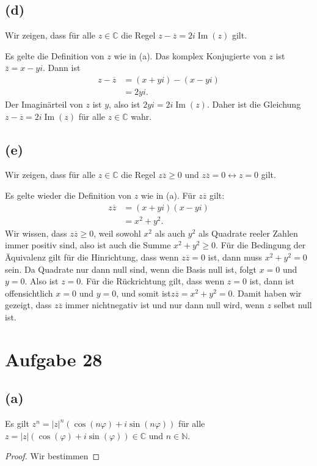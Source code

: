 \documentclass{article}
\theoremstyle{definition}
\theoremstyle{remark}
\begin{document}
\subsection*{(d)}
Wir zeigen, dass für alle \( z \in \mathbb{C} \) die Regel \( z - \overline{z} = 2i \operatorname{Im}(z) \) gilt.

\proof Es gelte die Definition von \( z \) wie in (a).
Das komplex Konjugierte von \( z \) ist \( \overline{z} = x - yi \). Dann ist
\begin{align*}
	z - \overline{z} & = (x + yi) - (x - yi) \\
	                 & = 2yi.
\end{align*}
Der Imaginärteil von \( z \) ist \( y \), also ist \( 2yi = 2i \operatorname{Im}(z) \). Daher ist die Gleichung \( z - \overline{z} = 2i \operatorname{Im}(z) \) für alle \( z \in \mathbb{C} \) wahr.
\endproof

\subsection*{(e)}
Wir zeigen, dass für alle \( z \in \mathbb{C} \) die Regel \( z \overline{z} \ge 0 \) und \( z \overline{z} = 0 \leftrightarrow z = 0\) gilt.

\proof Es gelte wieder die Definition von \( z \) wie in (a).
Für \( z \overline{z} \) gilt:
\begin{align*}
	z \overline{z} & = (x + yi)(x - yi) \\
	               & = x^2 + y^2.
\end{align*}
Wir wissen, dass \( z \overline{z} \ge 0\), weil sowohl \( x^2 \) als auch \( y^2 \) als Quadrate reeler Zahlen immer positiv sind, also ist auch die Summe \( x^2 + y^2 \ge 0 \).
Für die Bedingung der Äquivalenz gilt für die Hinrichtung, dass wenn \( z \overline{z} = 0 \) ist, dann muss \( x^2 + y^2 = 0\) sein. Da Quadrate nur dann null sind, wenn die Basis null ist, folgt \( x = 0 \) und \( y = 0 \). Also ist \( z = 0 \).
Für die Rückrichtung gilt, dass wenn \( z = 0 \) ist, dann ist offensichtlich \( x = 0 \) und \( y = 0 \), und somit ist\( z \overline{z} = x^2 + y^2 = 0 \).
Damit haben wir gezeigt, dass \( z \overline{z} \) immer nichtnegativ ist und nur dann null wird, wenn \( z \) selbst null ist.
\endproof

\section*{Aufgabe 28}

\subsection*{(a)}

\begin{theorem*}
	Es gilt \( z^n = |z|^n(\cos(n \varphi) + i \sin(n \varphi))\) für alle \( z = |z|(\cos(\varphi) + i \sin(\varphi)) \in \mathbb{C} \) und \( n \in \mathbb{N} \).
\end{theorem*}

\begin{proof} Wir bestimmen
	
\end{proof}
\end{document}
